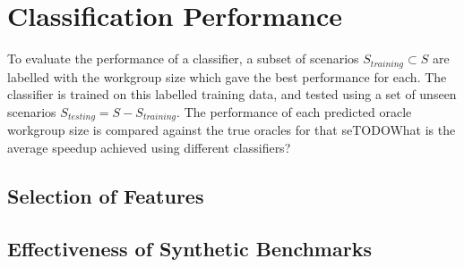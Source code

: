 

\section{Classification Performance}


To evaluate the performance of a classifier, a subset of scenarios
$S_{training} \subset S$ are labelled with the workgroup size which
gave the best performance for each. The classifier is trained on this
labelled training data, and tested using a set of unseen scenarios
$S_{testing} = S - S_{training}$. The performance of each predicted
oracle workgroup size is compared against the true oracles for that
seTODO{What is the average speedup achieved using different
  classifiers?}







\subsection{Selection of Features}



\subsection{Effectiveness of Synthetic Benchmarks}


